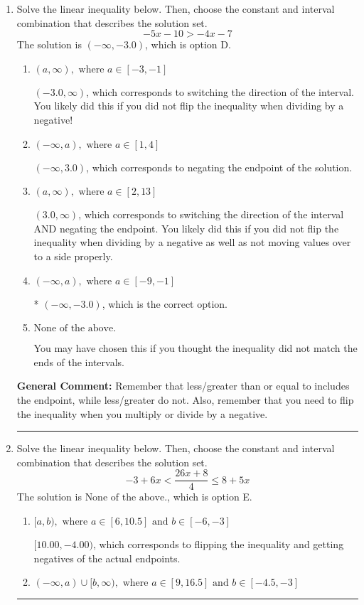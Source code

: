 \documentclass{extbook}[14pt]
\newcommand{\litem}[1]{\item #1

\rule{\textwidth}{0.4pt}}
\begin{document}
\begin{enumerate}\litem{
Solve the linear inequality below. Then, choose the constant and interval combination that describes the solution set.
\[ -5x -10 > -4x -7 \]The solution is \( (-\infty, -3.0) \), which is option D.\begin{enumerate}[label=\Alph*.]
\item \( (a, \infty), \text{ where } a \in [-3, -1] \)

 $(-3.0, \infty)$, which corresponds to switching the direction of the interval. You likely did this if you did not flip the inequality when dividing by a negative!
\item \( (-\infty, a), \text{ where } a \in [1, 4] \)

 $(-\infty, 3.0)$, which corresponds to negating the endpoint of the solution.
\item \( (a, \infty), \text{ where } a \in [2, 13] \)

 $(3.0, \infty)$, which corresponds to switching the direction of the interval AND negating the endpoint. You likely did this if you did not flip the inequality when dividing by a negative as well as not moving values over to a side properly.
\item \( (-\infty, a), \text{ where } a \in [-9, -1] \)

* $(-\infty, -3.0)$, which is the correct option.
\item \( \text{None of the above}. \)

You may have chosen this if you thought the inequality did not match the ends of the intervals.
\end{enumerate}

\textbf{General Comment:} Remember that less/greater than or equal to includes the endpoint, while less/greater do not. Also, remember that you need to flip the inequality when you multiply or divide by a negative.
}
\litem{
Solve the linear inequality below. Then, choose the constant and interval combination that describes the solution set.
\[ -3 + 6 x < \frac{26 x + 8}{4} \leq 8 + 5 x \]The solution is \( \text{None of the above.} \), which is option E.\begin{enumerate}[label=\Alph*.]
\item \( [a, b), \text{ where } a \in [6, 10.5] \text{ and } b \in [-6, -3] \)

$[10.00, -4.00)$, which corresponds to flipping the inequality and getting negatives of the actual endpoints.
\item \( (-\infty, a) \cup [b, \infty), \text{ where } a \in [9, 16.5] \text{ and } b \in [-4.5, -3] \)


\end{enumerate}}
\end{enumerate}
\end{document}
